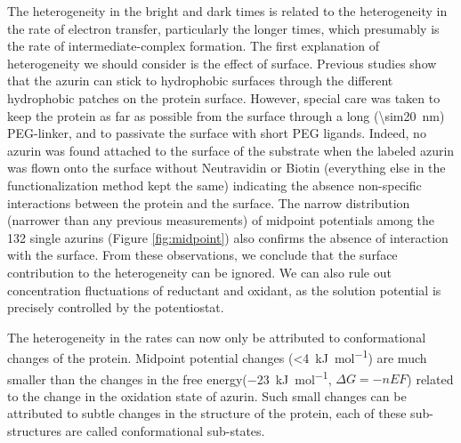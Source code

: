The heterogeneity in the bright and dark times is related to the heterogeneity in the rate of electron transfer, particularly the longer times, which presumably is the rate of intermediate-complex formation.
The first explanation of heterogeneity we should consider is the effect of surface.
Previous studies show that the azurin can stick to hydrophobic surfaces through the different hydrophobic patches on the protein surface.\cite{patil2010visualizing,salverda2010fluorescent,akkilic2014chemically-induced}
However, special care was taken to keep the protein as far as possible from the surface through a long (\SI{\sim20}{\nm}) PEG-linker, and to passivate the surface with short PEG ligands.
Indeed, no azurin was found attached to the surface of the substrate when the labeled azurin was flown onto the surface without Neutravidin or Biotin (everything else in the functionalization method kept the same) indicating the absence non-specific interactions between the protein and the surface.
The narrow distribution (narrower than any previous measurements) of midpoint potentials among the 132 single azurins (Figure \ref{fig:midpoint}) also confirms the absence of interaction with the surface.
From these observations, we conclude that the surface contribution to the heterogeneity can be ignored.
We can also rule out concentration fluctuations of reductant and oxidant, as the solution potential is precisely controlled by the potentiostat.


The heterogeneity in the rates can now only be attributed to conformational changes of the protein.
Midpoint potential changes (\SI{<4}{\kJ\per\mole}) are much smaller than the changes in the free energy(\SI{-23}{\kJ\per\mole}, $\Delta{G}=-nEF$) related to the change in the oxidation state of azurin.
Such small changes can be attributed to subtle changes in the structure of the protein, each of these sub-structures are called conformational sub-states.



